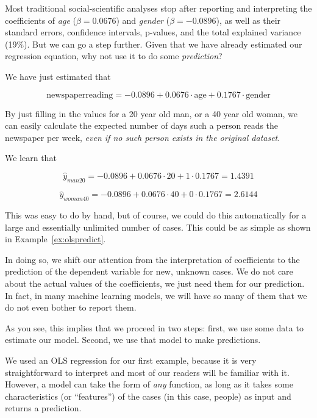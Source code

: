 
Most traditional social-scientific analyses stop after reporting and
interpreting the coefficients of \emph{age} ($\beta = 0.0676$) and \emph{gender} ($\beta = -0.0896$), as well as their standard errors, confidence intervals, p-values, and the total explained variance (19\%).
But we can go a step further. Given that we have already estimated our
regression equation, why not use it to do some \textit{prediction}?

We have just estimated that

$$\textrm{newspaperreading} = -0.0896 + 0.0676 \cdot \textrm{age} + 0.1767 \cdot \textrm{gender}$$

By just filling in the values for a 20 year old man, or a 40 year old
woman, we can easily calculate the expected number of days such a
person reads the newspaper per week, \emph{even if no such person
  exists in the original dataset}.

We learn that

$$\hat{y}_{man20} = -0.0896 + 0.0676 \cdot 20 + 1 \cdot 0.1767 = 1.4391$$

$$\hat{y}_{woman40} = -0.0896 + 0.0676 \cdot 40 + 0 \cdot 0.1767 = 2.6144$$

This was easy to do by hand, but of course, we could do this automatically for a large and essentially unlimited number of cases.
This could be as simple as shown in Example~\ref{ex:olspredict}.


In doing so, we shift our attention from the interpretation of coefficients to the prediction of the dependent variable for new, unknown cases. We do not
care about the actual values of the coefficients, we just need them for our prediction.
In fact, in many machine learning models, we will have so many of them that
we do not even bother to report them.

As you see, this implies that we proceed in two steps: first, we use some data
to estimate our model. Second, we use that model to make predictions.

We used an OLS regression for our first example, because it is very
straightforward to interpret and most of our readers will be familiar
with it.  However, a model can take the form of \emph{any} function,
as long as it takes some characteristics (or ``features'') of the
cases (in this case, people) as input and returns a prediction.

